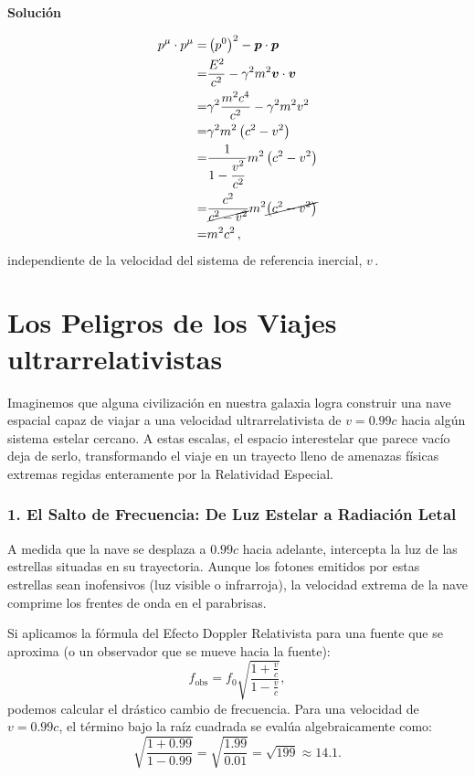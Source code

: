 \documentclass[11pt,a4paper]{book}
\begin{document}
\textbf{Solución}

\begin{align*}
    p^\mu \cdot p^\mu =& \left(p^0\right)^2 - \boldsymbol{p}\cdot \boldsymbol{p}\\
    =&\frac{E^2}{c^2} - \gamma^2 m^2 \boldsymbol{v}\cdot\boldsymbol{v}\\
    =&\gamma^2 \frac{m^2 c^4}{c^2} - \gamma^2 m^2 v^2\\
    =&\gamma^2 m^2 \left(c^2-v^2\right)\\
    =&\frac{1}{1-\dfrac{v^2}{c^2}} m^2 \left(c^2-v^2\right)\\
    =&\frac{c^2}{\cancel{c^2-v^2}} m^2 \cancel{\left(c^2-v^2\right)}\\
    =&m^2 c^2\,,
\end{align*}
independiente de la velocidad del sistema de referencia inercial, $v$\,.


\section{Los Peligros de los Viajes ultrarrelativistas}

Imaginemos que alguna civilización en nuestra galaxia logra construir una nave espacial capaz de viajar a una velocidad ultrarrelativista de $v = 0.99c$ hacia algún sistema estelar cercano. A estas escalas, el espacio interestelar que parece vacío deja de serlo, transformando el viaje en un trayecto lleno de amenazas físicas extremas regidas enteramente por la Relatividad Especial.

\subsubsection{1. El Salto de Frecuencia: De Luz Estelar a Radiación Letal}

A medida que la nave se desplaza a $0.99c$ hacia adelante, intercepta la luz de las estrellas situadas en su trayectoria. Aunque los fotones emitidos por estas estrellas sean inofensivos (luz visible o infrarroja), la velocidad extrema de la nave comprime los frentes de onda en el parabrisas.

Si aplicamos la fórmula del Efecto Doppler Relativista para una fuente que se aproxima (o un observador que se mueve hacia la fuente):
\begin{equation}
    f_{\text{obs}} = f_0 \sqrt{\frac{1 + \frac{v}{c}}{1 - \frac{v}{c}}},
    \label{eq:doppler_peligro}
\end{equation}
podemos calcular el drástico cambio de frecuencia. Para una velocidad de $v = 0.99c$, el término bajo la raíz cuadrada se evalúa algebraicamente como:
\begin{equation}
    \sqrt{\frac{1 + 0.99}{1 - 0.99}} = \sqrt{\frac{1.99}{0.01}} = \sqrt{199} \approx 14.1.
\end{equation}
\end{document}

